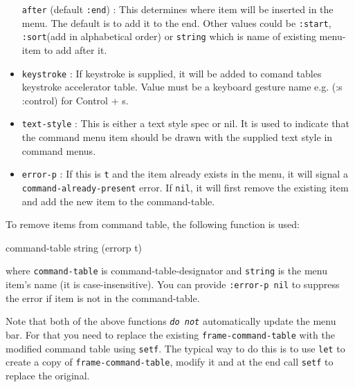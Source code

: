 \begin{itemize}
  \texttt{after} (default \texttt{:end}) : This determines where item
  will be inserted in the menu. The default is to add it to the
  end. Other values could be \texttt{:start}, \texttt{:sort}(add in
  alphabetical order) or \texttt{string} which is name of existing
  menu-item to add after it.
\item
  \texttt{keystroke} : If keystroke is supplied, it will be added to
  comand tables keystroke accelerator table. Value must be a keyboard
  gesture name e.g. (:s :control) for Control + s.
\item
  \texttt{text-style} : This is either a text style spec or nil. It is
  used to indicate that the command menu item should be drawn with the
  supplied text style in command menus.
\item
  \texttt{error-p} : If this is \texttt{t} and the item already exists
  in the menu, it will signal a \texttt{command-already-present}
  error. If \texttt{nil}, it will first remove the existing item and
  add the new item to the command-table.
\end{itemize}

To remove items from command table, the following function is used:

 {command-table string \key (errorp t)}

where \texttt{command-table} is command-table-designator and
\texttt{string} is the menu item's name (it is case-insensitive). You can
provide \texttt{:error-p nil} to suppress the error if item is not in
the command-table.

Note that both of the above functions \texttt{\emph{do not}}
automatically update the menu bar. For that you need to replace the
existing \texttt{frame-command-table} with the modified command table
using \texttt{setf}. The typical way to do this is to use \texttt{let}
to create a copy of \texttt{frame-command-table}, modify it and at the
end call \texttt{setf} to replace the original.
